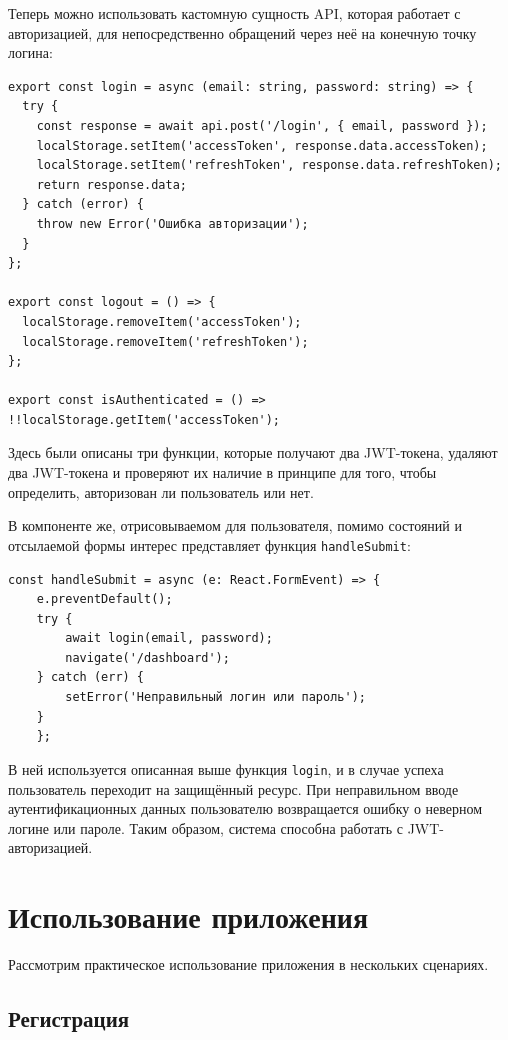 \documentclass[diploma]{SCWorks}
\begin{document}
Теперь можно использовать кастомную сущность API, которая работает 
с авторизацией, для непосредственно обращений через неё на конечную точку логина:

\begin{verbatim}
export const login = async (email: string, password: string) => {
  try {
    const response = await api.post('/login', { email, password });
    localStorage.setItem('accessToken', response.data.accessToken);
    localStorage.setItem('refreshToken', response.data.refreshToken);
    return response.data;
  } catch (error) {
    throw new Error('Ошибка авторизации');
  }
};

export const logout = () => {
  localStorage.removeItem('accessToken');
  localStorage.removeItem('refreshToken');
};

export const isAuthenticated = () => !!localStorage.getItem('accessToken');
\end{verbatim}

Здесь были описаны три функции, которые получают два JWT-токена, удаляют два 
JWT-токена и проверяют их наличие в принципе для того, чтобы определить, 
авторизован ли пользователь или нет.

В компоненте же, отрисовываемом для пользователя, помимо состояний и отсылаемой 
формы интерес представляет функция \texttt{handleSubmit}:

\begin{verbatim}
const handleSubmit = async (e: React.FormEvent) => {
    e.preventDefault();
    try {
        await login(email, password);
        navigate('/dashboard');
    } catch (err) {
        setError('Неправильный логин или пароль');
    }
    };
\end{verbatim}

В ней используется описанная выше функция \texttt{login}, и в случае успеха
пользователь переходит на защищённый ресурс. При неправильном вводе 
аутентификационных данных пользователю возвращается ошибку о неверном 
логине или пароле. Таким образом, система способна работать с JWT-авторизацией.

\section{Использование приложения}

Рассмотрим практическое использование приложения в нескольких сценариях.

\subsection{Регистрация}
\end{document}
